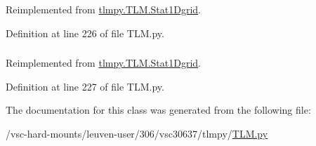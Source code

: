 Reimplemented from \hyperlink{classtlmpy_1_1TLM_1_1Stat1Dgrid_af21254e11378e0805b2f889ff67ed7ca}{tlmpy.TLM.Stat1Dgrid}.

Definition at line 226 of file TLM.py.\hypertarget{classtlmpy_1_1TLM_1_1Dyn1Dgrid_ad81cd7879d4ed2338d8eeb18ca48e03e}{
\subsubsection[{shape}]{}}
\label{classtlmpy_1_1TLM_1_1Dyn1Dgrid_ad81cd7879d4ed2338d8eeb18ca48e03e}


Reimplemented from \hyperlink{classtlmpy_1_1TLM_1_1Stat1Dgrid_aa0157077758d4f103ef19ccdb557d454}{tlmpy.TLM.Stat1Dgrid}.

Definition at line 227 of file TLM.py.

The documentation for this class was generated from the following file:\begin{DoxyCompactItemize}
\item 
/vsc-\/hard-\/mounts/leuven-\/user/306/vsc30637/tlmpy/\hyperlink{TLM_8py}{TLM.py}\end{DoxyCompactItemize}
